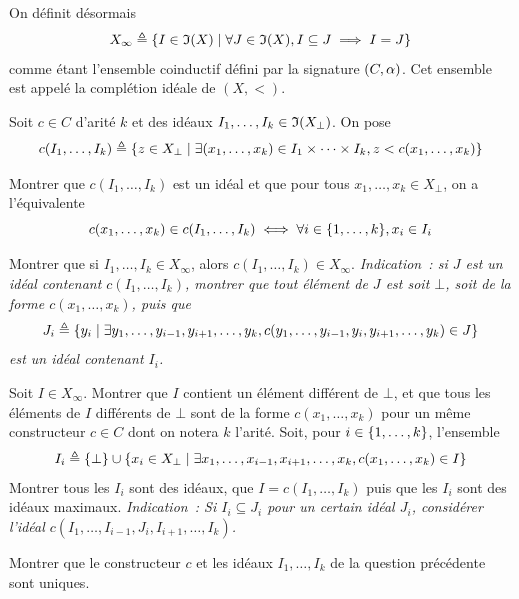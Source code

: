 \begin{problem}[La coinduction]
  On définit désormais
  \[X_\infty \triangleq \left\{ I \in \mathfrak{I}(X) \;\middle\vert\; \forall J \in \mathfrak{I}(X),
  I \subseteq J \implies I = J \right\}\]
  comme étant l'ensemble coinductif défini par la signature $(C,\alpha)$. Cet
  ensemble est appelé la complétion idéale de $(X,<)$.


  Soit $c\in C$ d'arité $k$ et des idéaux $I_1,\ldots,I_k \in \mathfrak{I}(X_\bot)$.
  On pose
  \[c(I_1,\ldots,I_k) \triangleq
  \left\{ z\in X_\bot \;\middle\vert\; \exists (x_1,\ldots,x_k) \in I_1\times\cdots \times I_k,
    z < c(x_1,\ldots,x_k) \right\}\]

  \begin{pbQuest}
  \item Montrer que $c(I_1,\ldots,I_k)$ est un idéal et que pour tous
    $x_1,\ldots,x_k\in X_\bot$, on a l'équivalente
    \[c(x_1,\ldots,x_k)\in c(I_1,\ldots,I_k) \iff
    \forall i \in \{1,\ldots,k\},x_i\in I_i\]
  \item Montrer que si $I_1,\ldots,I_k\in X_\infty$, alors
    $c(I_1,\ldots,I_k)\in X_\infty$. \textit{Indication~: si $J$ est un idéal
    contenant $c(I_1,\ldots,I_k)$, montrer que tout élément de $J$ est soit
    $\bot$, soit de la forme $c(x_1,\ldots,x_k)$, puis que
    \[J_i \triangleq \left\{ y_i \;\middle\vert\; \exists y_1,\ldots,y_{i-1},y_{i+1},\ldots,y_k,
      c(y_1,\ldots,y_{i-1},y_i,y_{i+1},\ldots,y_k)\in J \right\}\]
    est un idéal contenant $I_i$.}
  \item Soit $I\in X_{\infty}$. Montrer que $I$ contient un élément différent de
    $\bot$, et que tous les éléments de $I$ différents de $\bot$ sont de la
    forme $c(x_1,\ldots,x_k)$ pour un même constructeur $c\in C$ dont on notera
    $k$ l'arité. Soit, pour $i\in\{1,\ldots,k\}$, l'ensemble
    \[I_i \triangleq \{\bot\}\cup
    \left\{ x_i\in X_\bot \;\middle\vert\; \exists x_1,\ldots,x_{i-1},x_{i+1},\ldots,x_k, c(x_1,\ldots,x_k)\in I \right\}
    \]
    Montrer tous les $I_i$ sont des idéaux, que $I = c(I_1,\ldots,I_k)$ puis
    que les $I_i$ sont des idéaux maximaux. \textit{Indication~: Si
      $I_i\subseteq J_i$ pour un certain idéal $J_i$, considérer l'idéal
      $c(I_1,\ldots,I_{i-1},J_i,I_{i+1},\ldots,I_k)$.}
  \item Montrer que le constructeur $c$ et les idéaux $I_1,\ldots,I_k$ de la
    question précédente sont uniques.
  \end{pbQuest}


\end{problem}
